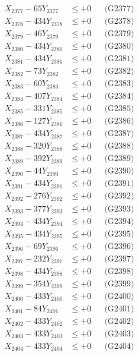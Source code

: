 \documentclass[a4paper,10pt]{article}
\begin{document}
{\begin{align}
X_{2377} - 65Y_{2377} &\leq +0 && \text{(G2377)} \\
X_{2378} - 434Y_{2378} &\leq +0 && \text{(G2378)} \\
X_{2379} - 46Y_{2379} &\leq +0 && \text{(G2379)} \\
X_{2380} - 434Y_{2380} &\leq +0 && \text{(G2380)} \\
\allowbreak
X_{2381} - 434Y_{2381} &\leq +0 && \text{(G2381)} \\
X_{2382} - 73Y_{2382} &\leq +0 && \text{(G2382)} \\
X_{2383} - 60Y_{2383} &\leq +0 && \text{(G2383)} \\
X_{2384} - 407Y_{2384} &\leq +0 && \text{(G2384)} \\
X_{2385} - 331Y_{2385} &\leq +0 && \text{(G2385)} \\
X_{2386} - 127Y_{2386} &\leq +0 && \text{(G2386)} \\
X_{2387} - 434Y_{2387} &\leq +0 && \text{(G2387)} \\
X_{2388} - 320Y_{2388} &\leq +0 && \text{(G2388)} \\
X_{2389} - 392Y_{2389} &\leq +0 && \text{(G2389)} \\
X_{2390} - 44Y_{2390} &\leq +0 && \text{(G2390)} \\
\allowbreak
X_{2391} - 434Y_{2391} &\leq +0 && \text{(G2391)} \\
X_{2392} - 276Y_{2392} &\leq +0 && \text{(G2392)} \\
X_{2393} - 377Y_{2393} &\leq +0 && \text{(G2393)} \\
X_{2394} - 434Y_{2394} &\leq +0 && \text{(G2394)} \\
X_{2395} - 434Y_{2395} &\leq +0 && \text{(G2395)} \\
X_{2396} - 69Y_{2396} &\leq +0 && \text{(G2396)} \\
X_{2397} - 232Y_{2397} &\leq +0 && \text{(G2397)} \\
X_{2398} - 434Y_{2398} &\leq +0 && \text{(G2398)} \\
X_{2399} - 354Y_{2399} &\leq +0 && \text{(G2399)} \\
X_{2400} - 433Y_{2400} &\leq +0 && \text{(G2400)} \\
\allowbreak
X_{2401} - 84Y_{2401} &\leq +0 && \text{(G2401)} \\
X_{2402} - 433Y_{2402} &\leq +0 && \text{(G2402)} \\
X_{2403} - 433Y_{2403} &\leq +0 && \text{(G2403)} \\
X_{2404} - 433Y_{2404} &\leq +0 && \text{(G2404)} \\

\end{align}}
\end{document}
